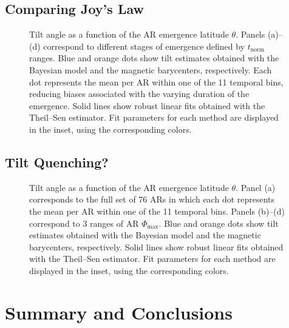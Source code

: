 \documentclass[namedreferences,hyperref,optionalrh]{spr-sola}
\newcommand{\mpc}[1]{{\bf \color{blue}{[Mariano comment: #1]}}}
\begin{document}
\subsection{Comparing Joy's Law}
\label{S-Joy}

\mpc{Comparative for different moments of the AR emergence}


   \begin{figure} 
 \caption{Tilt angle as a function of the AR emergence latitude $\theta$. Panels (a)–(d) correspond to different stages of emergence defined by $t_\mathrm{norm}$ ranges. Blue and orange dots show tilt estimates obtained with the Bayesian model and the magnetic barycenters, respectively. Each dot represents the mean per AR within one of the 11 temporal bins, reducing biases associated with the varying duration of the emergence. Solid lines show robust linear fits obtained with the Theil–Sen estimator. Fit parameters for each method are displayed in the inset, using the corresponding colors.} \label{fig:Joy-time}
 \end{figure}


 
\subsection{Tilt Quenching?}
 \label{S-Quenching}

\mpc{Tilt dependence of the Flux Strength?}

   \begin{figure} 
 \caption{Tilt angle as a function of the AR emergence latitude $\theta$. Panel (a) corresponds to the full set of 76 ARs in which each dot represents the mean per AR within one of the 11 temporal bins. Panels (b)–(d) correspond to 3 ranges of AR $\Phi_\mathrm{max}$. Blue and orange dots show tilt estimates obtained with the Bayesian model and the magnetic barycenters, respectively. Solid lines show robust linear fits obtained with the Theil–Sen estimator. Fit parameters for each method are displayed in the inset, using the corresponding colors.} \label{fig:Joy-flux}
 \end{figure}





\section{Summary and Conclusions} %
\label{S-conclusions}
\end{document}
